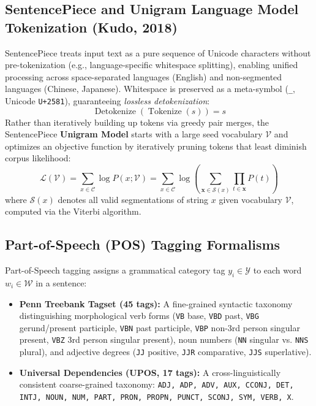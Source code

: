 \documentclass[12pt,a4paper]{report}
\begin{document}
\subsection{SentencePiece and Unigram Language Model Tokenization (Kudo, 2018)}
SentencePiece treats input text as a pure sequence of Unicode characters without pre-tokenization (e.g., language-specific whitespace splitting), enabling unified processing across space-separated languages (English) and non-segmented languages (Chinese, Japanese). Whitespace is preserved as a meta-symbol (\texttt{\_}, Unicode \texttt{U+2581}), guaranteeing \textit{lossless detokenization}:
\begin{equation}
    \operatorname{Detokenize}(\operatorname{Tokenize}(s)) = s
\end{equation}
Rather than iteratively building up tokens via greedy pair merges, the SentencePiece \textbf{Unigram Model} starts with a large seed vocabulary $\mathcal{V}$ and optimizes an objective function by iteratively pruning tokens that least diminish corpus likelihood:
\begin{equation}
    \mathcal{L}(\mathcal{V}) = \sum_{x \in \mathcal{C}} \log P(x; \mathcal{V}) = \sum_{x \in \mathcal{C}} \log \left( \sum_{\mathbf{x} \in \mathcal{S}(x)} \prod_{t \in \mathbf{x}} P(t) \right)
\end{equation}
where $\mathcal{S}(x)$ denotes all valid segmentations of string $x$ given vocabulary $\mathcal{V}$, computed via the Viterbi algorithm.

\subsection{Part-of-Speech (POS) Tagging Formalisms}
Part-of-Speech tagging assigns a grammatical category tag $y_i \in \mathcal{Y}$ to each word $w_i \in \mathcal{W}$ in a sentence:
\begin{itemize}
    \item \textbf{Penn Treebank Tagset (45 tags):} A fine-grained syntactic taxonomy distinguishing morphological verb forms (\texttt{VB} base, \texttt{VBD} past, \texttt{VBG} gerund/present participle, \texttt{VBN} past participle, \texttt{VBP} non-3rd person singular present, \texttt{VBZ} 3rd person singular present), noun numbers (\texttt{NN} singular vs. \texttt{NNS} plural), and adjective degrees (\texttt{JJ} positive, \texttt{JJR} comparative, \texttt{JJS} superlative).
    \item \textbf{Universal Dependencies (UPOS, 17 tags):} A cross-linguistically consistent coarse-grained taxonomy: \texttt{ADJ, ADP, ADV, AUX, CCONJ, DET, INTJ, NOUN, NUM, PART, PRON, PROPN, PUNCT, SCONJ, SYM, VERB, X}.
\end{itemize}
\end{document}
